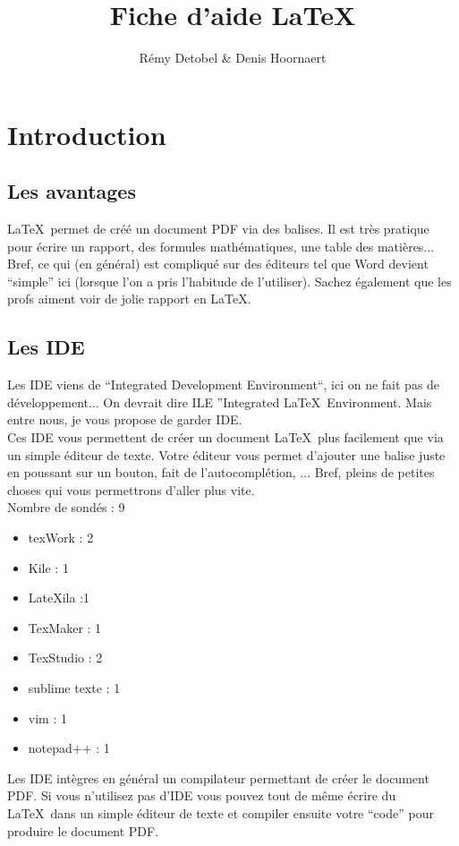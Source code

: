 \documentclass[a4paper,11pt]{article}
\title{Fiche d'aide \LaTeX}
\author{Rémy Detobel \& Denis Hoornaert}
\begin{document}
\maketitle

\newpage
\tableofcontents
\newpage


\section{Introduction}
  \subsection{Les avantages}
    \LaTeX\ permet de créé un document PDF via des balises.  Il est très pratique pour écrire un rapport, des formules mathématiques, une table des matières...  Bref, ce qui (en général) est compliqué sur des éditeurs tel que Word devient ``simple'' ici (lorsque l'on a pris l'habitude de l'utiliser).  Sachez également que les profs aiment voir de jolie rapport en \LaTeX.
    
  \subsection{Les IDE}
    Les IDE viens de ``Integrated Development Environment``, ici on ne fait pas de développement...  On devrait dire ILE ''Integrated \LaTeX\ Environment.  Mais entre nous, je vous propose de garder IDE.\\
    Ces IDE vous permettent de créer un document \LaTeX\ plus facilement que via un simple éditeur de texte.  Votre éditeur vous permet d'ajouter une balise juste en poussant sur un bouton, fait de l'autocomplétion, ...  Bref, pleins de petites choses qui vous permettrons d'aller plus vite.\\
    Nombre de sondés : 9
    \begin{itemize}
      \item texWork : 2
      \item Kile : 1
      \item LateXila :1
      \item TexMaker : 1
      \item TexStudio : 2
      \item sublime texte : 1
      \item vim : 1
      \item notepad++ : 1
    \end{itemize}
    Les IDE intègres en général un compilateur permettant de créer le document PDF.  Si vous n'utilisez pas d'IDE vous pouvez tout de même écrire du \LaTeX\ dans un simple éditeur de texte et compiler ensuite votre ``code'' pour produire le document PDF.
    
\end{document}
